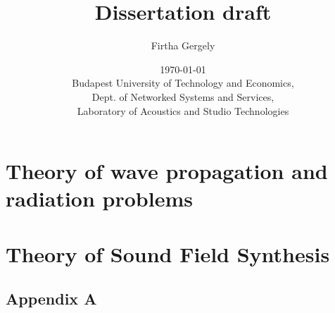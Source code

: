 \documentclass[12pt,a4paper]{report}
\title{ Dissertation draft}
\date{\today \\
Budapest University of Technology and Economics, \\ Dept. of Networked Systems and Services, \\ Laboratory of Acoustics and Studio Technologies}
\author{Firtha Gergely}
\begin{document}
\maketitle
\tableofcontents
\printnomenclature
%
%
%
%
\chapter{Theory of wave propagation and radiation problems}
\label{sec:theory}


\chapter{Theory of Sound Field Synthesis}
\label{sec:SFS_theory}


\begin{appendices}
\chapter{Appendix A}

%
\end{appendices}




\end{document}
